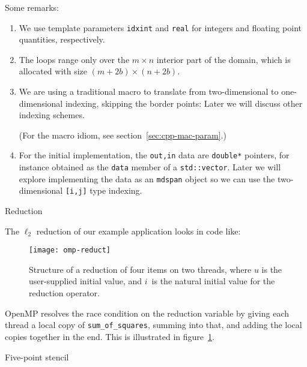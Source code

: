 Some remarks:
\begin{enumerate}
\item We use template parameters \lstinline{idxint} and \lstinline{real}
  for integers and floating point quantities, respectively.
\item
  The loops range only over the $m\times n$ interior part of the domain,
  which is allocated with size $(m+2b)\times(n+2b)$.
\item We are using a traditional macro to translate from two-dimensional
  to one-dimensional indexing, skipping the border points:
  Later we will discuss other indexing schemes.
\begin{packt}
    (For the macro idiom, see section~\ref{sec:cpp-mac-param}.)
\end{packt}
\item
  For the initial implementation, the \lstinline{out,in} data
  are \lstinline{double*} pointers, for instance obtained
  as the \lstinline{data} member of a \lstinline{std::vector}.
  Later we will explore implementing the data as an \lstinline{mdspan} object
  so we can use the two-dimensional \lstinline{[i,j]} type indexing.
\end{enumerate}

 {Reduction}

The $\ell_2$ reduction of our example application
looks in code like:
%

\begin{figure}[t]
  \texttt{[image: omp-reduct]}
  \caption{Structure of a reduction of four items on two threads,
    where $u$ is the user-supplied initial value,
    and $i$~is the natural initial value for the reduction operator.}
  \label{fig:omp-reduct}
\end{figure}

OpenMP resolves the race condition on the reduction variable
by giving each thread a local copy of \lstinline{sum_of_squares},
summing into that, and adding the local copies together in the end.
This is illustrated in figure~\ref{fig:omp-reduct}.


 {Five-point stencil}
\label{sec:d2d-5pt}

